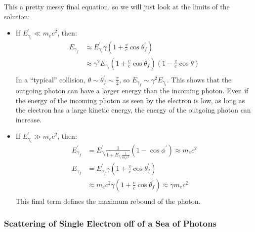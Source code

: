 \documentclass{article}
\begin{document}
This a pretty messy final equation, so we will just look at the limits of the solution:
\begin{itemize}
\item  If $E_{\gamma_i}^\prime\ll m_ec^2$, then:
$$\begin{aligned}E_{\gamma_f}&\approx E_{\gamma_i}^\prime\gamma(1+\frac{v}{c}\cos\theta_f^\prime)\\ 
&\approx\gamma^2E_{\gamma_i}(1+\frac{v}{c}\cos\theta_f^\prime)(1-\frac{v}{c}\cos\theta)\\ \end{aligned}$$
In a ``typical'' collision, $\theta\sim\theta_f^\prime\sim \frac{\pi}{2}$, so
$E_{\gamma_f}\sim\gamma^2E_{\gamma_i}$. This shows that the outgoing photon can have a larger energy than the incoming photon. Even if the energy of the incoming photon as seen by the electron is low, as long as the electron has a large kinetic energy, the energy of the outgoing photon can increase.
\item  If $E_{\gamma_i}^\prime\gg m_ec^2$, then:
$$\begin{aligned}E_{\gamma_f}^\prime&={E_{\gamma_i}^\prime \frac{1}{1+{E_{\gamma_i}^\prime \frac{1}{ m_ec^2}}}
(1-\cos\phi^\prime)}\approx m_ec^2\\ 
E_{\gamma_f}&=E_{\gamma_f}^\prime\gamma(1+\frac{v}{c}\cos\theta_f^\prime)\\ 
&\approx m_ec^2\gamma(1+\frac{v}{c}\cos\theta_f^\prime)\approx\gamma m_ec^2\\ \end{aligned}$$
This final term defines the maximum rebound of the photon.
\end{itemize}

\subsubsection{Scattering of Single Electron off of a Sea of Photons}
\end{document}
